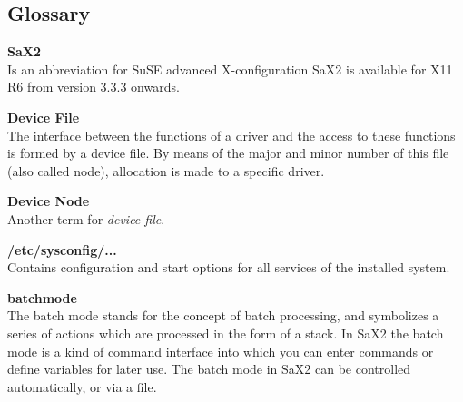 \begin{twocolumn}
\setcounter{secnumdepth}{-1}
\chapter{Glossary}

\begin{description}

\begin{small}
\item {\textbf{SaX2}\\} {
  Is an abbreviation for SuSE advanced X-configuration
  SaX2 is available for X11 R6 from version 3.3.3 onwards.
}

\item {\textbf{Device File}\\} {
  The interface between the functions of a driver and the access to these
  \linebreak functions is formed by a device file. By means of the major and
  minor number of this file (also called node), allocation is made to a
  specific driver.  
}

\item {\textbf{Device Node}\\} {
  Another term for \textit{device file}.
}

\item {\textbf{/etc/sysconfig/...}\\} {
  Contains configuration and start options for all services of the installed
  system. 
}

\item {\textbf{batchmode}\\} {
  The batch mode stands for the concept of batch processing, and symbolizes a
  series of actions which are processed in the form of a stack. In SaX2 the 
  batch mode is a kind of command interface into which you can enter commands
  or define variables for later use. The batch mode in SaX2 can be controlled
  automatically, or via a file.  
}

\end{small}
\end{description}
\end{twocolumn}


\onecolumn
